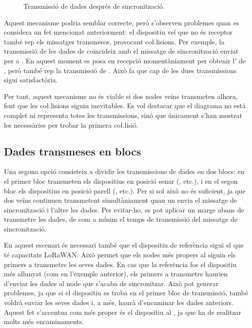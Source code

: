 \documentclass{tfgitic}[2024/07/01]
\begin{document}
{\begin{figure}
{\begin{tabular}
        \end{tabular}
    }
    \caption{Transmissió de dades després de sincronització.}
    \label{fig:app_opcioSyncExp1}
\end{figure}

Aquest mecanisme podria semblar correcte, però s'observen problemes quan es considera un fet mencionat anteriorment: el dispositiu veí que no és receptor també rep els missatges transmesos, provocant co\l.lisions. Per exemple, la transmissió de les dades de  coincideix amb el missatge de sincronització enviat per  a . En aquest moment  es posa en recepció momentàniament per obtenir l' de , però també rep la transmissió de . Això fa que cap de les dues transmissions sigui satisfactòria.

Per tant, aquest mecanisme no és viable si dos nodes veïns transmeten alhora, fent que les co\l.lisions siguin inevitables.
Es vol destacar que el diagrama no està complet ni representa totes les transmissions, sinó que únicament s'han mostrat les necessàries per trobar la primera co\l.lisió. 

\subsection{Dades transmeses en blocs}
Una segona opció consisteix a dividir les transmissions de dades en dos blocs: en el primer bloc transmeten els dispositius en posició senar (, etc.), i en el segon bloc els dispositius en posició parell (, etc.). Per si sol això no és suficient, ja que dos veïns continuen transmetent simultàniament quan un envia el missatge de sincronització i l'altre les dades. Per evitar-ho, es pot aplicar un marge abans de transmetre les dades, de com a mínim el temps de transmissió del missatge de sincronització. 

En aquest escenari és necessari també que el dispositiu de referència sigui el que té capacitats LoRaWAN. Això permet que els nodes més propers al  siguin els primers a transmetre les seves dades. En cas que la referència fos el dispositiu més allunyat (com en l'exemple anterior), els primers a transmetre haurien d'enviar les dades al node que s'acaba de sincronitzar. Això pot generar problemes, ja que si el dispositiu es troba en el primer bloc de transmissió, també voldrà enviar les seves dades i, a més, haurà d'encaminar les dades anteriors. Aquest fet s'accentua com més proper és el dispositiu al , ja que ha de realitzar molts més encaminaments.

}
\end{document}
